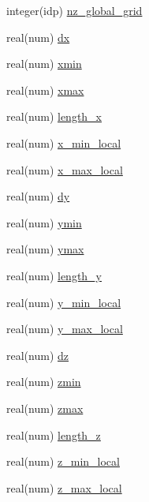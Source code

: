 \begin{DoxyCompactItemize}
integer(idp) \hyperlink{namespaceshared__data_aa95da47815e254e9835494899a595174}{nz\+\_\+global\+\_\+grid}
\item 
real(num) \hyperlink{namespaceshared__data_a0d718dcaae94920d7faaa4aa47011d5b}{dx}
\item 
real(num) \hyperlink{namespaceshared__data_a14da8910f32ccb1127e00fdf5dd9afbc}{xmin}
\item 
real(num) \hyperlink{namespaceshared__data_abf7145e6fa97e6f2650f0c09c8818b58}{xmax}
\item 
real(num) \hyperlink{namespaceshared__data_a3830a10a1c318950b0429ab6b6cd01c0}{length\+\_\+x}
\item 
real(num) \hyperlink{namespaceshared__data_a4a7c4b6eb045c3017f04dc08eb5cddcd}{x\+\_\+min\+\_\+local}
\item 
real(num) \hyperlink{namespaceshared__data_ab8f75a4e4e6aa88619c4f1cfde4dae1c}{x\+\_\+max\+\_\+local}
\item 
real(num) \hyperlink{namespaceshared__data_a6531be1297bb2ed26fdf8e7336d85e38}{dy}
\item 
real(num) \hyperlink{namespaceshared__data_a1a0991602b1e5feb2d937663c8e31927}{ymin}
\item 
real(num) \hyperlink{namespaceshared__data_abe75e74d4222157dbf64bb183266cd5d}{ymax}
\item 
real(num) \hyperlink{namespaceshared__data_a02349b6fb6d5942cb9aef10c149ff10f}{length\+\_\+y}
\item 
real(num) \hyperlink{namespaceshared__data_a3e7f4b2ead34c7eb9885b4b896127441}{y\+\_\+min\+\_\+local}
\item 
real(num) \hyperlink{namespaceshared__data_a0fb4b2d73929a142db79b38b0fdf8545}{y\+\_\+max\+\_\+local}
\item 
real(num) \hyperlink{namespaceshared__data_a2fb63621d7a6ce9df1700fe5cca75d01}{dz}
\item 
real(num) \hyperlink{namespaceshared__data_aa449f330a5cea14b12af9b1a68766626}{zmin}
\item 
real(num) \hyperlink{namespaceshared__data_aff54734070a6327d11c386fed6a31878}{zmax}
\item 
real(num) \hyperlink{namespaceshared__data_af762174f9cfb2c99e68a8eb993d220a0}{length\+\_\+z}
\item 
real(num) \hyperlink{namespaceshared__data_a1fb130b65ef2a707c1a79f91089e7dc0}{z\+\_\+min\+\_\+local}
\item 
real(num) \hyperlink{namespaceshared__data_a7931e0059b790ccef3cc00c59d806c7c}{z\+\_\+max\+\_\+local}
\item 

\end{DoxyCompactItemize}
